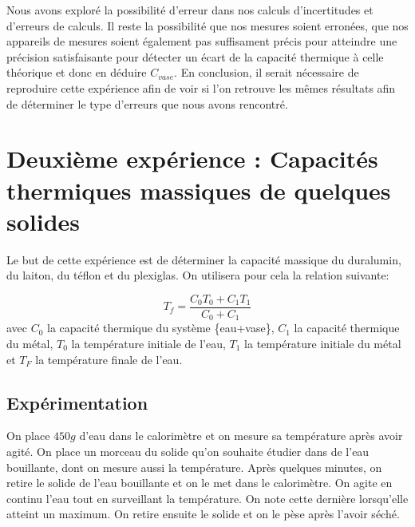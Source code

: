 \documentclass[12pt]{article}
\begin{document}
Nous avons exploré la possibilité d'erreur dans nos calculs d'incertitudes et d'erreurs de calculs. Il reste la possibilité que nos mesures soient erronées, que nos appareils de mesures soient également pas suffisament précis 
pour atteindre une précision satisfaisante pour détecter un écart de la capacité thermique à celle théorique et donc en déduire $C_{vase}$. En conclusion, il serait nécessaire de reproduire cette expérience afin de voir si l'on retrouve les mêmes résultats afin de déterminer le type d'erreurs que nous avons rencontré.

\newpage
\section{Deuxième expérience : Capacités thermiques massiques de quelques solides}

Le but de cette expérience est de déterminer la capacité massique du duralumin, du laiton, du téflon et du plexiglas. On utilisera pour cela la relation suivante:

\begin{equation}
	T_f=\frac{C_0T_0+C_1T_1}{C_0+C_1}
\label{EquationTf}
\end{equation}
avec $C_0$ la capacité thermique du système \{eau+vase\}, $C_1$ la capacité thermique du métal, $T_0$ la température initiale de l'eau, $T_1$ la température initiale du métal et $T_F$ la température finale de l'eau.

\subsection{Expérimentation}

On place $450g$ d'eau dans le calorimètre et on mesure sa température après avoir agité. On place un morceau du solide qu'on souhaite étudier dans de l'eau bouillante, dont on mesure aussi la température. 
Après quelques minutes, on retire le solide de l'eau bouillante et on le met dans le calorimètre. 
On agite en continu l'eau tout en surveillant la température. On note cette dernière lorsqu'elle atteint un maximum. 
On retire ensuite le solide et on le pèse après l'avoir séché.
\end{document}
